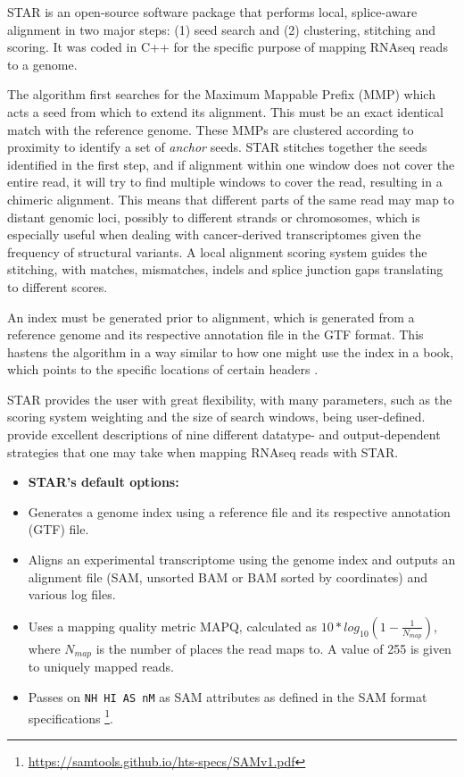 STAR is an open-source software package that performs local, splice-aware alignment in two major steps: (1) seed search and (2) clustering, stitching and scoring. It was coded in C++ for the specific purpose of mapping RNAseq reads to a genome.

The algorithm first searches for the Maximum Mappable Prefix (MMP) which acts a seed from which to extend its alignment. This must be an exact identical match with the reference genome. These MMPs are clustered according to proximity to identify a set of \textit{anchor} seeds. STAR stitches together the seeds identified in the first step, and if alignment within one window does not cover the entire read, it will try to find multiple windows to cover the read, resulting in a chimeric alignment. This means that different parts of the same read may map to distant genomic loci, possibly to different strands or chromosomes, which is especially useful when dealing with cancer-derived transcriptomes given the frequency of structural variants. A local alignment scoring system guides the stitching, with matches, mismatches, indels and splice junction gaps translating to different scores.

An index must be generated prior to alignment, which is generated from a reference genome and its respective annotation file in the GTF format. This hastens the algorithm in a way similar to how one might use the index in a book, which points to the specific locations of certain headers \citep{trapnell2009map}.

STAR provides the user with great flexibility, with many parameters, such as  the scoring system weighting and the size of search windows, being user-defined. \cite{dobin2015mapping} provide excellent descriptions of nine different datatype- and output-dependent strategies that one may take when mapping RNAseq reads with STAR. 


\begin{itemize}\itemsep0em
\item[] \textbf{STAR's default options:}
\item Generates a genome index using a reference file and its respective annotation (GTF) file.
\item Aligns an experimental transcriptome using the genome index and outputs an alignment file (SAM, unsorted BAM or BAM sorted by coordinates) and various log files.
\item Uses a mapping quality metric MAPQ, calculated as $10*log_{10}(1-\frac{1}{N_{map}})$, where ${N_{map}}$ is the number of places the read maps to. A value of 255 is given to uniquely mapped reads.
\item Passes on \texttt{NH HI AS nM} as SAM attributes as defined in the SAM format specifications \footnote{\url{https://samtools.github.io/hts-specs/SAMv1.pdf}}.
\end{itemize}

